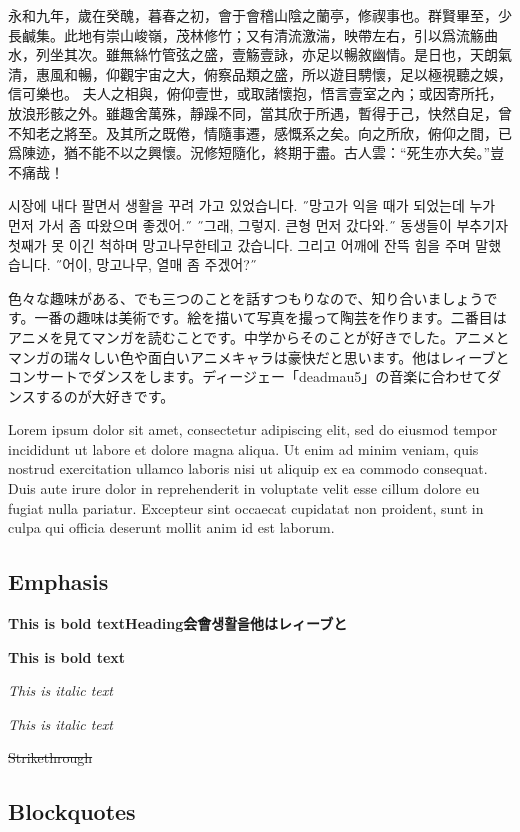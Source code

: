 \documentclass[
  paper=a4,
  ,captions=tableheading
]{scrartcl}
\renewcommand{\st}[1]{\sout{#1}}
\begin{document}
永和九年，歲在癸醜，暮春之初，會于會稽山陰之蘭亭，修禊事也。群賢畢至，少長鹹集。此地有崇山峻嶺，茂林修竹；又有清流激湍，映帶左右，引以爲流觞曲水，列坐其次。雖無絲竹管弦之盛，壹觞壹詠，亦足以暢敘幽情。是日也，天朗氣清，惠風和暢，仰觀宇宙之大，俯察品類之盛，所以遊目騁懷，足以極視聽之娛，信可樂也。
夫人之相與，俯仰壹世，或取諸懷抱，悟言壹室之內；或因寄所托，放浪形骸之外。雖趣舍萬殊，靜躁不同，當其欣于所遇，暫得于己，快然自足，曾不知老之將至。及其所之既倦，情隨事遷，感慨系之矣。向之所欣，俯仰之間，已爲陳迹，猶不能不以之興懷。況修短隨化，終期于盡。古人雲：``死生亦大矣。''豈不痛哉！

시장에 내다 팔면서 생활을 꾸려 가고 있었습니다. ˝망고가 익을 때가
되었는데 누가 먼저 가서 좀 따왔으며 좋겠어.˝ ˝그래, 그렇지. 큰형 먼저
갔다와.˝ 동생들이 부추기자 첫째가 못 이긴 척하며 망고나무한테고
갔습니다. 그리고 어깨에 잔뜩 힘을 주며 말했습니다. ˝어이, 망고나무, 열매
좀 주겠어?˝

色々な趣味がある、でも三つのことを話すつもりなので、知り合いましょうです。一番の趣味は美術です。絵を描いて写真を撮って陶芸を作ります。二番目はアニメを見てマンガを読むことです。中学からそのことが好きでした。アニメとマンガの瑞々しい色や面白いアニメキャラは豪快だと思います。他はレィーブとコンサートでダンスをします。ディージェー「deadmau5」の音楽に合わせてダンスするのが大好きです。

Lorem ipsum dolor sit amet, consectetur adipiscing elit, sed do eiusmod
tempor incididunt ut labore et dolore magna aliqua. Ut enim ad minim
veniam, quis nostrud exercitation ullamco laboris nisi ut aliquip ex ea
commodo consequat. Duis aute irure dolor in reprehenderit in voluptate
velit esse cillum dolore eu fugiat nulla pariatur. Excepteur sint
occaecat cupidatat non proident, sunt in culpa qui officia deserunt
mollit anim id est laborum.

\hypertarget{emphasis}{%
\subsection{Emphasis}\label{emphasis}}

\textbf{This is bold textHeading会會생활을他はレィーブと}

\textbf{This is bold text}

\emph{This is italic text}

\emph{This is italic text}

\st{Strikethrough}

\hypertarget{blockquotes}{%
\subsection{Blockquotes}\label{blockquotes}}
\end{document}
